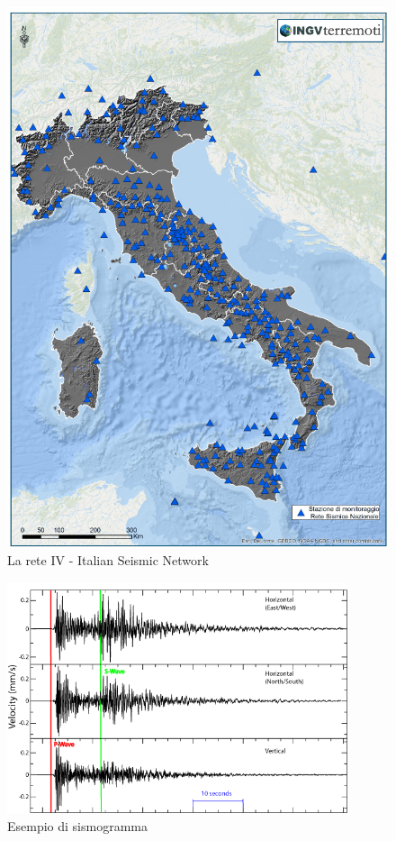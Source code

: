 \documentclass[a4paper,10pt]{memoir}
\begin{document}
\begin{figure}[p]
\caption{La rete IV - Italian Seismic Network}
\label{fig:retesensori}
\centering
\includegraphics[width=\textwidth]{introduzione/rete_ingv}
\end{figure}

\begin{figure}[ht]
\caption{Esempio di sismogramma}
\label{fig:sismogramma}
\centering
\includegraphics[width=10cm]{introduzione/seismogram}
\end{figure}
\end{document}
